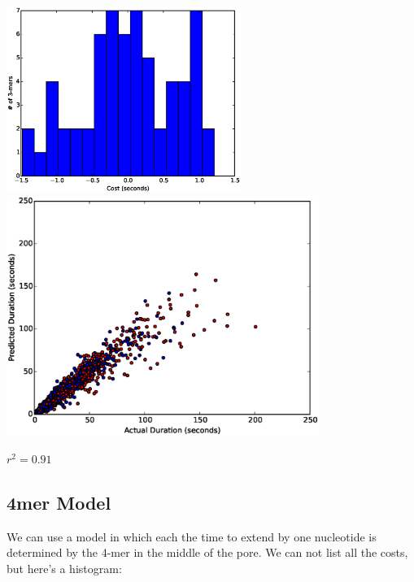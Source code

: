 \documentclass[11pt]{article}
\begin{document}
\includegraphics[width=3in]{part11hist3}\\
\includegraphics[width=4in]{part11scatter3mer}

$r^2=0.91$

\subsection*{4mer Model}

        We can use a model in which each the time to extend by one nucleotide is determined by the 4-mer in the middle of the
        pore.  We can not list all the costs, but here's a histogram:
        
\end{document}
